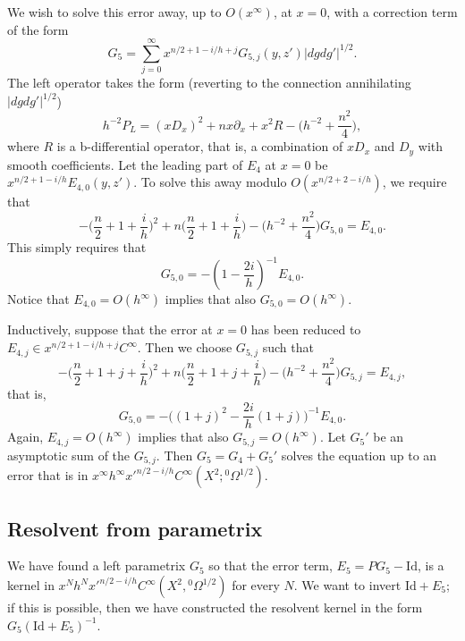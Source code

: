 \documentclass[10pt, a4paper, twoside]{amsart}
\numberwithin{equation}{section}
\theoremstyle{remark}
\begin{document}
We wish to solve this error away, up to $O(x^\infty)$, at $x=0$, with a correction term of the form 
$$
G_5 = \sum_{j=0}^\infty  x^{n/2 +1  -i/h + j} G_{5, j}(y, z') |dg dg'|^{1/2}.
$$
The left operator takes the form (reverting to the connection annihilating $|dg dg'|^{1/2}$) 
$$
h^{-2} P_L = (x D_x)^2 + n x \partial_x + x^2 R - \big(h^{-2} + \frac{n^2}{4} \big),
$$
where $R$ is a b-differential operator, that is, a combination of $x D_x$ and $D_y$ with smooth coefficients. Let the leading part of $E_4$ at $x=0$ be $x^{n/2 + 1 -i/h} E_{4, 0}(y, z')$. To solve this away modulo $O(x^{n/2 + 2 -i/h})$, we require that
$$
- \big(\frac{n}{2} + 1 + \frac{i}{h} \big)^2 + n \big(\frac{n}{2} + 1 + \frac{i}{h} \big) - \big(h^{-2} + \frac{n^2}{4} \big) G_{5, 0} = E_{4, 0}.
$$
This simply requires that 
$$
G_{5, 0} = -(1 - \frac{2i}{h})^{-1} E_{4, 0}.
$$
Notice that $E_{4, 0} = O(h^\infty)$ implies that also $G_{5, 0} = O(h^\infty)$. 

Inductively, suppose that the error at $x=0$ has been reduced to $E_{4, j} \in x^{n/2 + 1 -i/h + j} C^\infty$. Then we choose $G_{5, j}$ such that 
$$
- \big(\frac{n}{2} + 1 + j + \frac{i}{h} \big)^2 + n \big(\frac{n}{2} + 1 +j + \frac{i}{h} \big) - \big(h^{-2} + \frac{n^2}{4} \big) G_{5, j} = E_{4, j},
$$
that is, 
$$
G_{5, 0} = -\Big((1+j)^2  - \frac{2i}{h}(1+j)\Big)^{-1} E_{4, 0}.
$$
Again, $E_{4, j} = O(h^\infty)$ implies that also $G_{5, j} = O(h^\infty)$. Let $G_5'$ be an  asymptotic sum  of the $G_{5, j}$. Then $G_5 = G_4 + G_5'$ solves the equation up to an error that is in $x^\infty h^\infty {x'}^{n/2-i/h} C^\infty(X^2; {{}^0\Omega^{1/2}})$. 

\subsection{Resolvent from parametrix}

We have found a left parametrix $G_5$ so that the error term, $E_5 = P G_5 - {\mathrm{Id}}$, is a kernel in $x^N h^N {x'}^{n/2-i/h} C^\infty(X^2, {{}^0\Omega^{1/2}})$ for every $N$. We want to invert ${\mathrm{Id}} + E_5$; if this is possible, then we have constructed the resolvent kernel in the form $G_5({\mathrm{Id}} + E_5)^{-1}$. 
\end{document}
